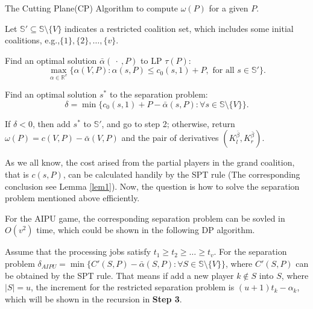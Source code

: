 \begin{algorithm}[H]\label{algoCP}
\caption{The Cutting Plane(CP) Algorithm to compute $\omega(P)$ for a given $P$.}
\begin{algorithmic}[1]

\begin{description}
  \justifying
  \item[Step 1.] Let $\mathbb{S}'\subseteq \mathbb{S}\setminus \{V\}$ indicates a restricted coalition set, which includes some initial coalitions,
  \vspace{10pt}
  e.g.,$ \{1\},\{2\},\ldots,\{v\}$.
  \item[Step 2.] Find an optimal solution $\bar{\alpha}(\ \cdot \ ,P)$ to LP $\tau(P)$:
  \begin{equation*}
  \max_{\alpha\in \mathbb{R}^v} \big\{ \alpha(V,P): \alpha(s,P) \leq c_0(s,1)+P, \mbox{ for all } s \in \mathbb{S}'\big\}.
  \end{equation*}
  \vspace{-11pt}
  \item[Step 3.]
  Find an optimal solution $s^*$ to the separation problem:
  \begin{equation*}
  \delta = \min \big\{ c_0(s,1)+ P -\bar{\alpha}(s,P): \forall s \in \mathbb{S} \setminus \{V\}\big\}.
  \end{equation*}
  \item[Step 4.]
  If $\delta<0$, then add $s^*$ to $\mathbb{S}'$, and go to step 2; otherwise, return $\omega(P)=c(V,P)-\bar{\alpha}(V,P)$ and the pair of derivatives $(K_{l}^{\bar{\beta}},K_{r}^{\bar{\beta}})$.
\end{description}

\end{algorithmic}
\end{algorithm}

As we all know, the cost arised from the partial players in the grand coalition, that is $c(s,P)$, can be calculated handily by the SPT rule (The corresponding conclusion see Lemma \ref{lem1}).
Now, the question is how to solve the separation problem mentioned above efficiently.

\begin{lem}\label{lem3}
  For the AIPU game, the corresponding separation problem can be sovled in $O(v^2)$ time, which could be shown in the following DP algorithm.
\end{lem}

Assume that the processing jobs satisfy $t_1 \geq t_2 \geq \ldots \geq t_v$. For the separation problem $\delta_{AIPU} = \min \big\{ C'(S,P) -\bar{\alpha}(S,P): \forall S \in \mathbb{S} \setminus \{V\}\big\}$, where $C'(S,P)$ can be obtained by the SPT rule. That means if add a new player $k\notin S$ into $S$, where $|S| =u$, the increment for the restricted separation problem is $(u+1)t_k-\alpha_k$, which will be shown in the recursion in \textbf{Step 3}.

